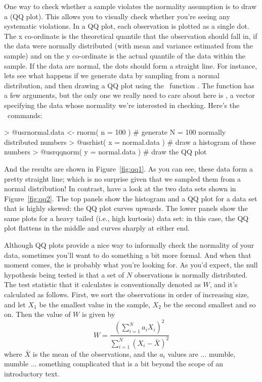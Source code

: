 One way to check whether a sample violates the normality assumption is to draw a  (QQ plot). This allows you to visually check whether you're seeing any systematic violations. In a QQ plot, each observation is plotted as a single dot. The x co-ordinate is the theoretical quantile that the observation should fall in, if the data were normally distributed (with mean and variance estimated from the sample) and on the y co-ordinate is the actual quantile of the data within the sample. If the data are normal, the dots should form a straight line. For instance, lets see what happens if we generate data by sampling from a normal distribution, and then drawing a QQ plot using the \R\ function . The  function has a few arguments, but the only one we really need to care about here is , a vector specifying the data whose normality we're interested in checking. Here's the \R\ commands:
\begin{rblock1}
> @usr{normal.data <- rnorm( n = 100 )}  # generate N = 100 normally distributed numbers
> @usr{hist( x = normal.data )}          # draw a histogram of these numbers
> @usr{qqnorm( y = normal.data )}        # draw the QQ plot
\end{rblock1}
And the results are shown in Figure~\ref{fig:qq1}. As you can see, these data form a pretty straight line; which is no surprise given that we sampled them from a normal distribution! In contrast, have a look at the two data sets shown in Figure~\ref{fig:qq2}. The top panels show the histogram and a QQ plot for a data set that is highly skewed: the QQ plot curves upwards. The lower panels show the same plots for a heavy tailed (i.e., high kurtosis) data set: in this case, the QQ plot flattens in the middle and curves sharply at either end.





Although QQ plots provide a nice way to informally check the normality of your data, sometimes you'll want to do something a bit more formal. And when that moment comes, the  \cite{Shapiro1965} is probably what you're looking for. As you'd expect, the null hypothesis being tested is that a set of $N$ observations is normally distributed. The test statistic that it calculates is conventionally denoted as $W$, and it's calculated as follows. First, we sort the observations in order of increasing size, and let $X_1$ be the smallest value in the sample, $X_2$ be the second smallest and so on. Then the value of $W$ is given by
$$
W = \frac{ \left( \sum_{i = 1}^N a_i X_i \right)^2 }{ \sum_{i = 1}^N (X_i - \bar{X})^2}
$$
where $\bar{X}$ is the mean of the observations, and the $a_i$ values are ... mumble, mumble ... something complicated that is a bit beyond the scope of an introductory text. 

